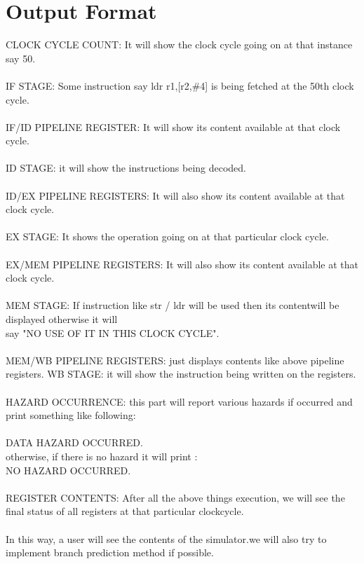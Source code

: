 \documentclass{scrreprt}
\begin{document}
\section{Output Format}
$ $\\
CLOCK CYCLE COUNT: It will show the clock cycle going on at that instance say 50.\\
\\
IF STAGE: Some instruction say ldr r1,[r2,\#4] is being fetched at the 50th clock cycle.\\
\\
IF/ID PIPELINE REGISTER: It will show its content available at that clock cycle.\\
\\
ID STAGE: it will show the instructions being decoded.\\
\\
ID/EX PIPELINE REGISTERS: It will also show its content available at that clock cycle.\\
\\
EX STAGE: It shows the operation going on at that particular clock cycle.\\
\\
EX/MEM PIPELINE REGISTERS: It will also show its content available at that clock cycle.\\
\\
MEM STAGE: If instruction like str / ldr will be used then its contentwill be displayed otherwise it will \\
\indent   say "NO USE OF IT IN THIS CLOCK CYCLE".\\
\\
MEM/WB PIPELINE REGISTERS: just displays contents like above pipeline registers.
WB STAGE:  it will show the instruction being written on the registers.\\
\\
HAZARD OCCURRENCE: this part will report various hazards if occurred and print something like following:\\
\\
\indent  DATA HAZARD OCCURRED.\\
\indent  otherwise, if there is no hazard it will print :\\
\indent  NO HAZARD OCCURRED.\\
\\
REGISTER CONTENTS: After all the above things execution, we will see the final status of all registers at that particular clockcycle.\\
\\
In this way, a user will see the contents of the simulator.we will also try to implement branch prediction method if possible. \\
\\
$ $
\end{document}
